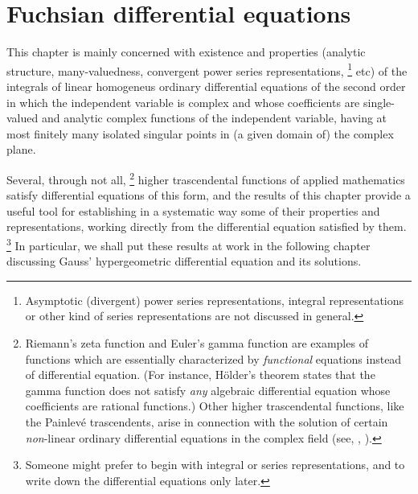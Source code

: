 \chapter{Fuchsian differential equations}
\label{chap:fuchs}


This chapter is mainly concerned with existence and properties (analytic structure, many-valuedness,
convergent power series representations,%
\footnote{Asymptotic (divergent) power series
   representations, integral representations or other kind of series
   representations are not discussed in general.}
etc) of the integrals of linear homogeneus ordinary differential equations of the
second order in which the independent variable is complex and whose coefficients
are single-valued and analytic complex functions of the independent variable, having
at most finitely many isolated singular points in (a given domain of) the
complex plane.







Several, through  not all,%
\footnote{Riemann's zeta function and Euler's gamma function are examples of
   functions which are essentially characterized by \emph{functional} equations
   instead of differential equation.  (For instance, H\"older's theorem states that
   the gamma function does not satisfy \emph{any} algebraic differential equation
   whose coefficients are rational functions.) Other higher trascendental
   functions, like the Painlev\'e trascendents, arise in connection with the
   solution of certain \emph{non}-linear ordinary differential equations in the
   complex field (see, \eg, \textcite{Ince:1956}).}
   higher trascendental functions of applied
mathematics satisfy differential equations of this form,
   and the results of this chapter
provide a useful  tool for establishing in a systematic way some of their
properties and representations, working directly from the differential
equation satisfied by them.%
\footnote{Someone might prefer to begin
   with integral or series representations, 
   and to write down the differential
   equations only later.} In particular, we shall put these
results at work in the following chapter discussing Gauss' hypergeometric
differential equation and its solutions.

